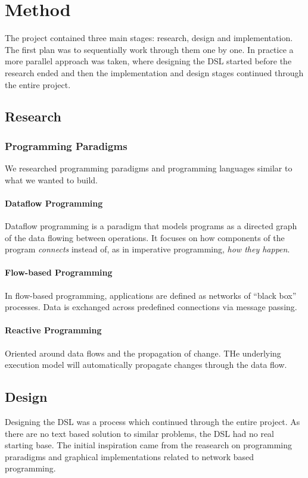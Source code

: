 \chapter{Method}
The project contained three main stages: research, design and
implementation. The first plan was to sequentially work through them
one by one. In practice a more parallel approach was taken, where
designing the DSL started before the research ended and then the
implementation and design stages continued through the entire project.


\section{Research}

\subsection{Programming Paradigms}
We researched programming paradigms and programming languages similar
to what we wanted to build.

\subsubsection{Dataflow Programming}
Dataflow programming is a paradigm that models programs as a directed
graph of the data flowing between operations. It focuses on how
components of the program \emph{connects} instead of, as in imperative
programming, \emph{how they happen}. 

\subsubsection{Flow-based Programming}
In flow-based programming, applications are defined as networks of
``black box'' processes. Data is exchanged across predefined
connections via message passing. 

\subsubsection{Reactive Programming}
Oriented around data flows and the propagation of change. THe
underlying execution model will automatically propagate changes
through the data flow. 


\section{Design}
Designing the DSL was a process which continued through the entire
project. As there are no text based solution to similar problems, the
DSL had no real starting base. The initial inspiration came from the
reasearch on programming praradigms and graphical implementations
related to network based programming.


